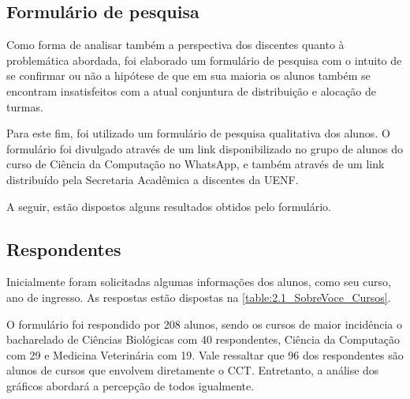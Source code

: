 \begin{apendicesenv} %

  \chapter*{Formulário de pesquisa} \label{chap:Formulário de pesquisa}


  Como forma de analisar também a perspectiva dos discentes quanto à problemática abordada, foi elaborado um formulário de pesquisa com o intuito de se confirmar ou não a hipótese de que em sua maioria os alunos também se encontram insatisfeitos com a atual conjuntura de distribuição e alocação de turmas.

  Para este fim, foi utilizado um formulário de pesquisa qualitativa dos alunos. O formulário foi divulgado através de um link disponibilizado no grupo de alunos do curso de Ciência da Computação no WhatsApp, e também através de um link distribuído pela Secretaria Acadêmica a discentes da UENF.

  A seguir, estão dispostos alguns resultados obtidos pelo formulário.

  \section*{Respondentes} \label{sec:Respondentes}

  Inicialmente foram solicitadas algumas informações dos alunos, como seu curso, ano de ingresso. As respostas estão dispostas na \autoref{table:2.1_SobreVoce_Cursos}.


  O formulário foi respondido por 208 alunos, sendo os cursos de maior incidência o bacharelado de Ciências Biológicas com 40 respondentes, Ciência da Computação com 29 e Medicina Veterinária com 19. Vale ressaltar que 96 dos respondentes são alunos de cursos que envolvem diretamente o CCT. Entretanto, a análise dos gráficos abordará a percepção de todos igualmente.


\end{apendicesenv}
